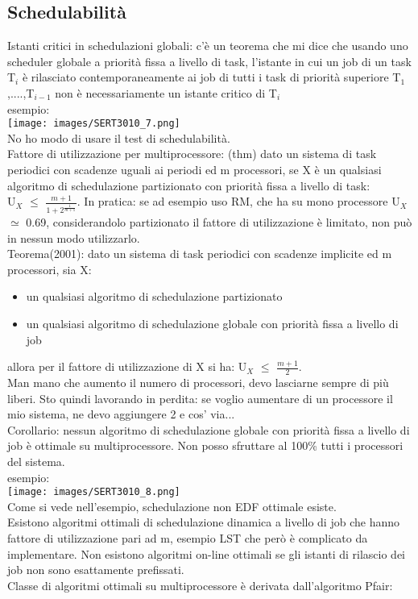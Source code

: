\documentclass[18px]{article}
\begin{document}
\subsection{Schedulabilità}
Istanti critici in schedulazioni globali: c'è un teorema che mi dice che usando uno scheduler globale a priorità fissa a livello di task, l'istante in cui un job di un task T$_{i}$ è rilasciato contemporaneamente ai job di tutti i task di priorità superiore T$_{1}$,....,T$_{i-1}$ non è necessariamente un istante critico di T$_{i}$\\ esempio:\\
\texttt{[image: images/SERT3010\_7.png]}\\ No ho modo di usare il test di schedulabilità.\\ Fattore di utilizzazione per multiprocessore: (thm) dato un sistema di task periodici con scadenze uguali ai periodi ed m processori, se X è un qualsiasi algoritmo di schedulazione partizionato con priorità fissa a livello di task:\\
U$_{X}$ $\leq$ $\frac{m + 1}{1 + 2^{\frac{1}{m +1}}}$. In pratica: se ad esempio uso RM, che ha su mono processore U$_{X}$ $\simeq$ 0.69, considerandolo partizionato il fattore di utilizzazione è limitato, non può in nessun modo utilizzarlo.\\ Teorema(2001): dato un sistema di task periodici con scadenze implicite ed m processori, sia X:
\begin{itemize}
\item un qualsiasi algoritmo di schedulazione partizionato
\item un qualsiasi algoritmo di schedulazione globale con priorità fissa a livello di job
\end{itemize}
allora per il fattore di utilizzazione di X si ha: U$_{X}$ $\leq$ $\frac{m + 1}{2}$.\\ Man mano che aumento il numero di processori, devo lasciarne sempre di più liberi. Sto quindi lavorando in perdita: se voglio aumentare di un processore il mio sistema, ne devo aggiungere 2 e cos' via...\\ Corollario: nessun algoritmo di schedulazione globale con priorità fissa a livello di job è ottimale su multiprocessore. Non posso sfruttare al 100\% tutti i processori del sistema.\\ esempio:\\
\texttt{[image: images/SERT3010\_8.png]}\\ Come si vede nell'esempio, schedulazione non EDF ottimale esiste.\\ Esistono algoritmi ottimali di schedulazione dinamica a livello di job che hanno fattore di utilizzazione pari ad m, esempio LST che però è complicato da implementare. Non esistono algoritmi on-line ottimali se gli istanti di rilascio dei job non sono esattamente prefissati.\\ Classe di algoritmi ottimali su multiprocessore è derivata dall'algoritmo Pfair:
\end{document}
